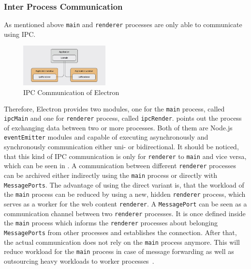 \subsubsection{Inter Process Communication}
As mentioned above \texttt{main} and \texttt{renderer} processes are only able to communicate using \ac{IPC}.
\begin{figure}[ht]
    \centering
    \includegraphics[width=0.4\textwidth]{images/ipcElectron}
    \caption[Bla]{IPC Communication of Electron~\cite[Fig. 6.5]{electron-nwjs}}
    \label{fig:electron:ipc}
\end{figure}
Therefore, Electron provides two modules, one for the \texttt{main} process, called \texttt{ipcMain} and one for \texttt{renderer} process, called \texttt{ipcRender}.
 points out the process of exchanging data between two or more processes.
Both of them are Node.js \texttt{eventEmitter} modules and capable of executing asynchronously and synchronously communication either uni- or bidirectional.
It should be noticed, that this kind of \ac{IPC} communication is only for \texttt{renderer} to \texttt{main} and vice versa, which can be seen in .
A communication between different \texttt{renderer} processes can be archived either indirectly using the \texttt{main} process or directly with \texttt{MessagePorts}.
The advantage of using the direct variant is, that the workload of the \texttt{main} process can be reduced by using a new, hidden \texttt{renderer} process, which serves as a worker for the web content \texttt{renderer}.
A \texttt{MessagePort} can be seen as a communication channel between two \texttt{renderer} processes.
It is once defined inside the \texttt{main} process which informs the \texttt{renderer} processes about belonging \texttt{MessagePorts} from other processes and establishes the connection.
After that, the actual communication does not rely on the \texttt{main} process anymore.
This will reduce workload for the \texttt{main} process in case of message forwarding as well as outsourcing heavy workloads to worker processes~\cite{ElectronDoc}.
